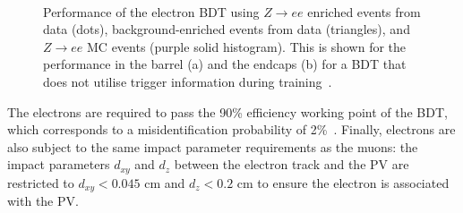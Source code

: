 \begin{figure}[t]
\centering
     \\
\caption[Plots of the electron identification performance.]{Performance of the electron BDT using $Z\rightarrow ee$ enriched events from data (dots), background-enriched events from data (triangles), and $Z\rightarrow ee$ MC events (purple solid histogram). This is shown for the performance in the barrel (a) and the endcaps (b) for a BDT that does not utilise trigger information during training~\cite{CMS:2015xaf}.}
\label{fig:electron_eff}
\end{figure}

The electrons are required to pass the 90\% efficiency working point of the \ac{BDT}, which corresponds to a misidentification probability of 2\%~\cite{CMS:2015xaf}. 
Finally, electrons are also subject to the same impact parameter requirements as the muons: the impact parameters $d_{xy}$ and $d_{z}$ between the electron track and the \ac{PV} are restricted to $d_{xy}<0.045$ cm and $d_{z}<0.2$ cm to ensure the electron is associated with the \ac{PV}. \\

